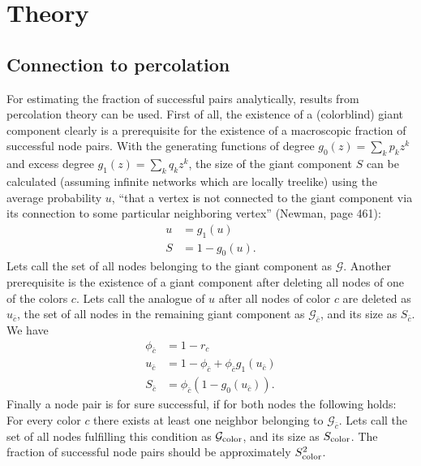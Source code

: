 \documentclass[aps, pre, onecolumn, a4paper, floatfix]{revtex4}
\begin{document}
\section{Theory}

\subsection{Connection to percolation}

For estimating the fraction of successful pairs analytically, results from percolation 
theory can be used. First of all, the existence of a (colorblind) giant component clearly is a 
prerequisite for the existence of a macroscopic fraction of successful node pairs. With the 
generating functions of degree $g_0(z)=\sum_k p_k z^k$ and excess degree 
$g_1(z)=\sum_k q_k z^k$, the size of the giant component $S$ can be calculated (assuming infinite
networks which are locally treelike) using 
the average probability $u$, ``that a vertex is not connected to the giant component 
via its connection to some particular neighboring vertex'' (Newman, page 461): 
\begin{align}
u &= g_1(u)\\
S &= 1 - g_0(u).\label{eq:gc}
\end{align}
Lets call the set of all nodes belonging to the giant component as ${\mathcal G}$. 
Another prerequisite is the existence of a giant component after deleting all nodes of one 
of the colors $c$. Lets call the analogue of $u$ after all nodes of color $c$ are 
deleted as $u_{\bar c}$, the set of all nodes in the remaining giant component as 
${\mathcal G}_{\bar c}$, and its size as $S_{\bar c}$. 
We have 
\begin{align}
\phi_{\bar c} &= 1-r_c\\
u_{\bar c} &= 1-\phi_{\bar c} + \phi_{\bar c} g_1(u_{\bar c})\label{eq:u_c}\\
S_{\bar c} &= \phi_{\bar c} (1-g_0(u_{\bar c})).
\end{align}
Finally a node pair is for sure successful, if for both nodes the following 
holds: For every color $c$ there exists at least one neighbor belonging to 
${\mathcal G}_{\bar c}$. Lets call the set of all nodes fulfilling this 
condition as ${\mathcal G}_{\rm color}$, and its size as $S_{\rm color}$. 
The fraction of successful node pairs should be approximately $S_{\rm color}^2$. 
\end{document}
